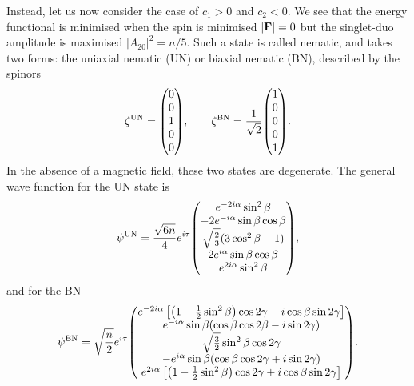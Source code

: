 Instead, let us now consider the case of \(c_1 > 0\) and \(c_2 < 0\).
We see that the energy functional is minimised when the spin is minimised
\(|\vb{F}| = 0\) but the singlet-duo amplitude is maximised
\(|A_{20}|^2 = n/5\).
Such a state is called nematic, and takes two forms: the uniaxial nematic (UN)
or biaxial nematic (BN), described by the spinors
\begin{equation}
    \zeta^\mathrm{UN} = \mqty(0 \\ 0 \\ 1 \\ 0 \\ 0), \qquad
    \zeta^\mathrm{BN} = \frac{1}{\sqrt{2}}\mqty(1 \\ 0 \\0 \\ 0 \\ 1).
\end{equation}
In the absence of a magnetic field, these two states are degenerate.
The general wave function for the UN state is
\begin{equation}\label{eq: UN-representative-spinor}
    \psi^\mathrm{UN} = \frac{\sqrt{6n}}{4}e^{i\tau}\mqty(
    e^{-2i\alpha} \sin^2\beta \\
    -2e^{-i\alpha} \sin\beta \cos\beta \\
    \sqrt{\frac{2}{3}}(3\cos^2\beta - 1) \\
    2e^{i\alpha} \sin\beta \cos\beta \\
    e^{2i\alpha} \sin^2\beta
    ),
\end{equation}
and for the BN
\begin{equation}\label{eq: BN-representative-spinor}
    \psi^\mathrm{BN} = \sqrt{\frac{n}{2}}e^{i\tau} \mqty(
    e^{-2i\alpha}\left[\left(1 - \frac{1}{2}\sin^2\beta\right)\cos 2\gamma
        - i\cos\beta\sin 2\gamma\right] \\
    e^{-i\alpha}\sin\beta(\cos\beta\cos 2\beta - i\sin 2\gamma) \\
    \sqrt{\frac{3}{2}}\sin^2\beta \cos 2\gamma \\
    -e^{i\alpha}\sin\beta(\cos\beta\cos 2\gamma + i\sin 2\gamma) \\
    e^{2i\alpha}\left[\left(1 - \frac{1}{2}\sin^2\beta\right)\cos 2\gamma
        + i\cos\beta\sin 2\gamma\right]
    ).
\end{equation}

